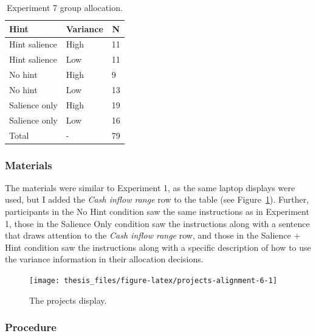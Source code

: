 \documentclass[a4paper, nobind, dvipsnames]{templates/ociamthesis}
\theoremstyle{definition}
\theoremstyle{definition}
\theoremstyle{definition}
\theoremstyle{definition}
\theoremstyle{remark}
\begin{document}
\begin{table}[tbp]

\begin{center}
\begin{threeparttable}

\caption{\label{tab:condition-allocation-alignment-6}Experiment 7 group allocation.}

\begin{tabular}{lll}
\toprule
Hint & \multicolumn{1}{c}{Variance} & \multicolumn{1}{c}{N}\\
\midrule
Hint salience & High & 11\\
Hint salience & Low & 11\\
No hint & High & 9\\
No hint & Low & 13\\
Salience only & High & 19\\
Salience only & Low & 16\\
Total & - & 79\\
\bottomrule
\end{tabular}

\end{threeparttable}
\end{center}

\end{table}

\subsubsection{Materials}

The materials were similar to Experiment 1, as the same laptop displays were
used, but I added the \emph{Cash inflow range} row to the table (see
Figure~\ref{fig:projects-alignment-6}). Further, participants in the No Hint
condition saw the same instructions as in Experiment 1, those in the Salience
Only condition saw the instructions along with a sentence that draws attention
to the \emph{Cash inflow range} row, and those in the Salience + Hint condition saw
the instructions along with a specific description of how to use the variance
information in their allocation decisions.



\begin{figure}
\texttt{[image: thesis\_files/figure-latex/projects-alignment-6-1]} \caption{The projects display.}\label{fig:projects-alignment-6}
\end{figure}

\subsubsection{Procedure}
\end{document}
